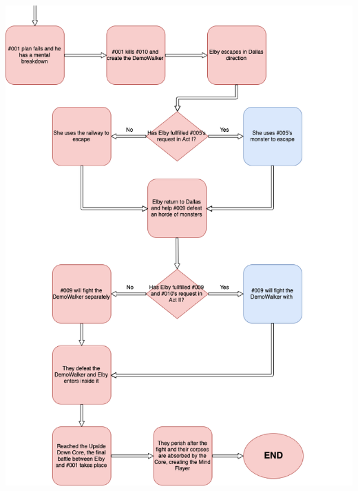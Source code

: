 \begin{center}
	\includegraphics[width=0.99\linewidth]{images/graphs/story_flowchart_3.png}
\end{center}